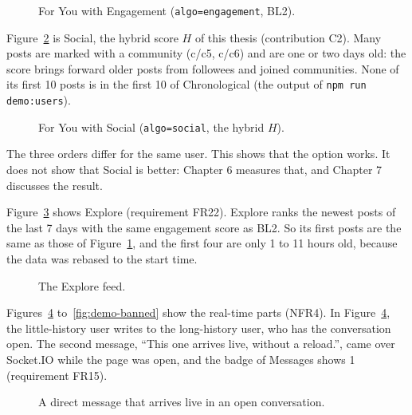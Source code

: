 \begin{figure}[htbp]
  \centering
  \caption{For You with Engagement (\texttt{algo=engagement}, BL2).}
  \label{fig:demo-engagement}
\end{figure}

Figure~\ref{fig:demo-social} is Social, the hybrid score $H$ of this thesis (contribution C2). Many posts are marked with a community (c/c5, c/c6) and are one or two days old: the score brings forward older posts from followees and joined communities. None of its first 10 posts is in the first 10 of Chronological (the output of \texttt{npm run demo:users}).

\begin{figure}[htbp]
  \centering
  \caption{For You with Social (\texttt{algo=social}, the hybrid $H$).}
  \label{fig:demo-social}
\end{figure}

The three orders differ for the same user. This shows that the option works. It does not show that Social is better: Chapter 6 measures that, and Chapter 7 discusses the result.

Figure~\ref{fig:demo-explore} shows Explore (requirement FR22). Explore ranks the newest posts of the last 7 days with the same engagement score as BL2. So its first posts are the same as those of Figure~\ref{fig:demo-engagement}, and the first four are only 1 to 11 hours old, because the data was rebased to the start time.

\begin{figure}[htbp]
  \centering
  \caption{The Explore feed.}
  \label{fig:demo-explore}
\end{figure}

Figures~\ref{fig:demo-dm} to~\ref{fig:demo-banned} show the real-time parts (NFR4). In Figure~\ref{fig:demo-dm}, the little-history user writes to the long-history user, who has the conversation open. The second message, ``This one arrives live, without a reload.'', came over Socket.IO while the page was open, and the badge of Messages shows 1 (requirement FR15).

\begin{figure}[htbp]
  \centering
  \caption{A direct message that arrives live in an open conversation.}
  \label{fig:demo-dm}
\end{figure}

